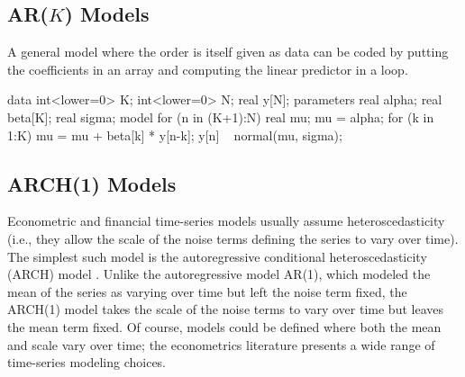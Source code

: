 \subsection{AR($K$) Models}

A general model where the order is itself given as data can be coded
by putting the coefficients in an array and computing the linear
predictor in a loop.
%
\begin{stancode}
data {
  int<lower=0> K;
  int<lower=0> N;
  real y[N];
}
parameters {
  real alpha;
  real beta[K];
  real sigma;
}
model {
  for (n in (K+1):N) {
    real mu;
    mu = alpha;
    for (k in 1:K)
      mu = mu + beta[k] * y[n-k];
    y[n] ~ normal(mu, sigma);
  }
}
\end{stancode}

\subsection{ARCH(1) Models}

Econometric and financial time-series models usually assume
heteroscedasticity (i.e., they allow the scale of the noise terms
defining the series to vary over time).
The simplest such model is the autoregressive conditional
heteroscedasticity (ARCH) model \citep{Engle:1982}.  Unlike the
autoregressive model AR(1), which modeled the mean of the series as
varying over time but left the noise term fixed, the ARCH(1) model
takes the scale of the noise terms to vary over time but leaves the
mean term fixed.  Of course, models could be defined where both the
mean and scale vary over time; the econometrics literature presents a
wide range of time-series modeling choices.

